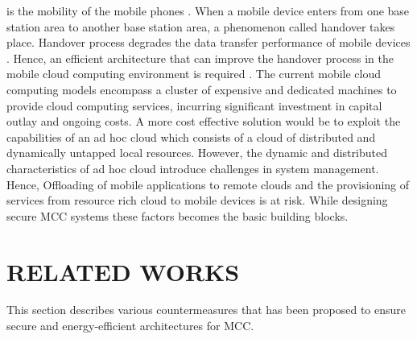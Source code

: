 \documentclass[10pt,a4paper,journal]{IEEEtran}
\begin{document}
is the mobility of the mobile phones \cite{9}. When a mobile device enters from one base station area to another base station area, a phenomenon called handover takes place. Handover process degrades the data transfer performance of mobile devices \cite{11}. Hence, an efficient architecture that can improve the handover process in the mobile cloud computing environment is required \cite{10}. The current mobile cloud computing models encompass a cluster of expensive and dedicated machines to provide cloud computing services, incurring significant investment in capital outlay and ongoing costs. A more cost effective solution would be to exploit the capabilities of an ad hoc cloud which consists of a cloud of distributed and dynamically untapped local resources. However, the dynamic and distributed characteristics of ad hoc cloud \cite{12} introduce
challenges in system management. Hence, Offloading of mobile applications to remote clouds and the provisioning of services from resource rich cloud to mobile devices is at risk. While designing secure MCC systems these factors becomes the basic building blocks. 

\section{RELATED WORKS}
\hspace{2em} This section describes various countermeasures that has been proposed to ensure secure and energy-efficient architectures for MCC.\\
 
\end{document}

